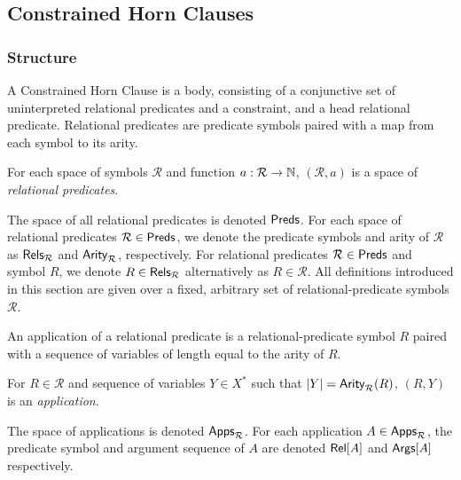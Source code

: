 \subsection{Constrained Horn Clauses}
\label{sec:chcs}

\subsubsection{Structure}
A Constrained Horn Clause is a body, consisting of a conjunctive set
of uninterpreted relational predicates and a constraint, and a head
relational predicate.
%
Relational predicates are predicate symbols paired with a map from
each symbol to its arity.
%
\begin{defn}
  \label{defn:rel-preds}
  For each space of symbols $\mathcal{R}$ and function $a: \mathcal{R}
  \to \mathbb{N}$, $(\mathcal{R}, a)$ is a space of \emph{relational
    predicates}.
\end{defn}
%
The space of all relational predicates is denoted $\mathsf{Preds}$.
%
For each space of relational predicates $\mathcal{R} \in \mathsf{Preds}$,
we denote the predicate symbols and arity of $\mathcal{R}$ as
$\mathsf{Rels}_{\mathcal{R}}$ and $\mathsf{Arity}_{\mathcal{R}}$, respectively.
%
For relational predicates $\mathcal{R} \in \mathsf{Preds}$ and symbol $R$,
we denote $R \in \mathsf{Rels}_{ \mathcal{R} }$ alternatively as $R \in
\mathcal{R}$.
%
All definitions introduced in this section are given over a fixed,
arbitrary set of relational-predicate symbols $\mathcal{R}$.

An application of a relational predicate is a relational-predicate
symbol $R$ paired with a sequence of variables of length equal to the
arity of $R$.
%
\begin{defn}
  \label{defn:pred-apps}
  For $R \in \mathcal{R}$ and sequence of variables $Y \in X^{*}$ such
  that $|Y| = \mathsf{Arity}_{\mathcal{R}}(R)$, $(R, Y)$ is an
  \emph{application}.
\end{defn}
%
The space of applications is denoted $\mathsf{Apps}_{\mathcal{R}}$.
%
For each application $A \in \mathsf{Apps}_{\mathcal{R}}$, the predicate symbol
and argument sequence of $A$ are denoted $\mathsf{Rel}[ A ]$ and $\mathsf{Args}[ A ]$
respectively.

